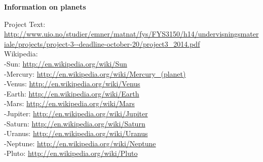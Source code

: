 \documentclass[11 pt, a4 paper]{article}
\newenvironment{tabbed}{\begin{addmargin}{0.1cm}}{\end{addmargin}}
\newcommand{\sectionundertitle}[1]{\hspace{-0.5cm} \textbf{{#1}}}
\begin{document}
\sectionundertitle{Information on planets}
    \begin{tabbed}
        Project Text:\\
        \url{http://www.uio.no/studier/emner/matnat/fys/FYS3150/h14/undervisningsmateriale/projects/project-3--deadline-october-20/project3_2014.pdf}\\
        Wikipedia:\\
        -Sun: \url{http://en.wikipedia.org/wiki/Sun}\\
        -Mercury: \url{http://en.wikipedia.org/wiki/Mercury_(planet)}\\
        -Venus: \url{http://en.wikipedia.org/wiki/Venus}\\
        -Earth: \url{http://en.wikipedia.org/wiki/Earth}\\
        -Mars: \url{http://en.wikipedia.org/wiki/Mars}\\
        -Jupiter: \url{http://en.wikipedia.org/wiki/Jupiter}\\
        -Saturn: \url{http://en.wikipedia.org/wiki/Saturn}\\
        -Uranus: \url{http://en.wikipedia.org/wiki/Uranus}\\
        -Neptune: \url{http://en.wikipedia.org/wiki/Neptune}\\
        -Pluto: \url{http://en.wikipedia.org/wiki/Pluto}
    \end{tabbed}
\end{document}
